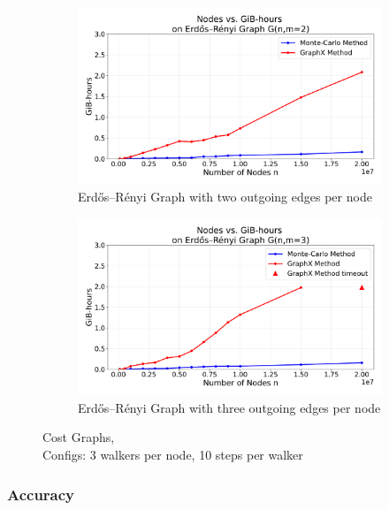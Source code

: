 \begin{figure}[H]
    \centering
    \begin{subfigure}[t]{0.5\linewidth}
        \centering
        \includegraphics[width=\linewidth]{images/plots/ER_2edg/gbhrs_nodes_er_graph_2edges.pdf}
        \caption{Erdős–Rényi Graph with two outgoing edges per node}
        \label{fig:wikigibhrs}
    \end{subfigure}
    \begin{subfigure}[t]{0.5\linewidth}
        \centering
        \includegraphics[width=\linewidth]{images/plots/ER_3edg/gbhrs_nodes_er_graph_3edges.pdf}
        \caption{Erdős–Rényi Graph with three outgoing edges per node}
        \label{fig:wikigibhrs}
    \end{subfigure}
    \caption{Cost Graphs, \\ Configs: 3 walkers per node, 10 steps per walker}
    \label{fig:wiki-comparison}
\end{figure}

\subsubsection{Accuracy}

